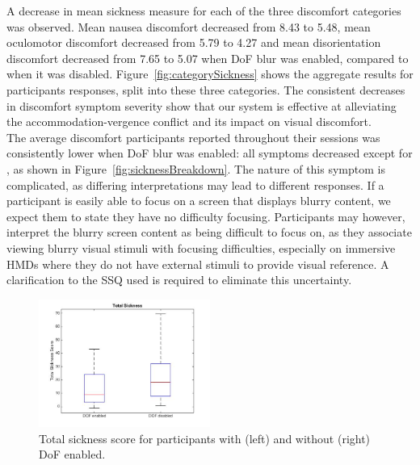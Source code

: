 A decrease in mean sickness measure for each of the three discomfort categories~\cite{kennedy93} was observed. Mean nausea discomfort decreased from 8.43 to 5.48, mean oculomotor discomfort decreased from 5.79 to 4.27 and mean disorientation discomfort decreased from 7.65 to 5.07 when DoF blur was enabled, compared to when it was disabled. Figure~\ref{fig:categorySickness} shows the aggregate results for participants responses, split into these three categories. The consistent decreases in discomfort symptom severity show that our system is effective at alleviating the accommodation-vergence conflict and its impact on visual  discomfort.\\

The average discomfort participants reported throughout their sessions was consistently lower when DoF blur was enabled: all symptoms decreased except for , as shown in Figure~\ref{fig:sicknessBreakdown}. The nature of this symptom is complicated, as differing interpretations may lead to different responses. If a participant is easily able to focus on a screen that displays blurry content, we expect them to state they have no difficulty focusing. Participants may however, interpret the blurry screen content as being difficult to focus on, as they associate viewing blurry visual stimuli with focusing difficulties, especially on immersive HMDs where they do not have external stimuli to provide visual reference. A clarification to the SSQ used is required to eliminate this uncertainty.\\ 

\begin{figure}
        \centering
            \includegraphics[width=0.5\textwidth]{images/total.jpg}
            \caption{Total sickness score for participants with (left) and without (right) DoF enabled.}
            \label{fig:totalSicknessScore}
\end{figure}


